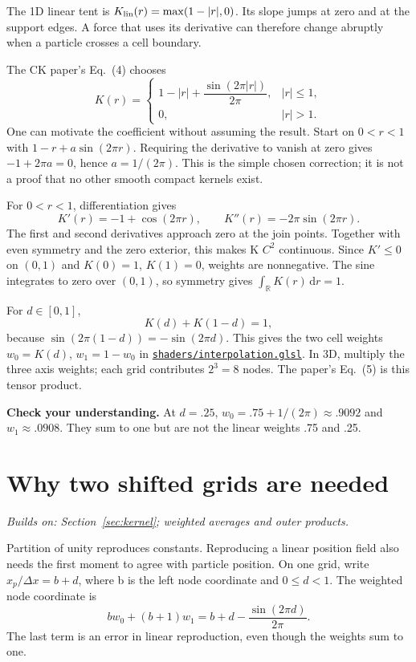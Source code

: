 \documentclass[11pt,a4paper]{article}
\newcommand{\src}[1]{\href{../../#1}{\nolinkurl{#1}}}
\newcommand{\prereq}[1]{\textit{Builds on: #1}\par}
\newcommand{\checkpoint}[1]{\par\textbf{Check your understanding.} #1\par}
\numberwithin{equation}{section}
\begin{document}
The 1D linear tent is $K_{\rm lin}(r)=\max(1-|r|,0)$. Its slope jumps at zero
and at the support edges. A force that uses its derivative can therefore change
abruptly when a particle crosses a cell boundary.

The CK paper's Eq.~(4) chooses
\begin{equation}\label{eq:ck}
K(r)=\begin{cases}
1-|r|+\dfrac{\sin(2\pi|r|)}{2\pi},& |r|\le1,\\
0,&|r|>1.
\end{cases}
\end{equation}
One can motivate the coefficient without assuming the result. Start on
$0<r<1$ with $1-r+a\sin(2\pi r)$. Requiring the derivative to vanish at zero
gives $-1+2\pi a=0$, hence $a=1/(2\pi)$. This is the simple chosen correction;
it is not a proof that no other smooth compact kernels exist.

For $0<r<1$, differentiation gives
\[
K'(r)=-1+\cos(2\pi r),\qquad K''(r)=-2\pi\sin(2\pi r).
\]
The first and second derivatives approach zero at the join points. Together
with even symmetry and the zero exterior, this makes K $C^2$ continuous.
Since $K'\le0$ on $(0,1)$ and $K(0)=1$, $K(1)=0$, weights are nonnegative.
The sine integrates to zero over $(0,1)$, so symmetry gives
$\int_{\mathbb R}K(r)\,\mathrm dr=1$.

For $d\in[0,1]$,
\begin{equation}\label{eq:unity}
K(d)+K(1-d)=1,
\end{equation}
because $\sin(2\pi(1-d))=-\sin(2\pi d)$.
This gives the two cell weights $w_0=K(d)$, $w_1=1-w_0$ in
\src{shaders/interpolation.glsl}. In 3D, multiply the three axis weights;
each grid contributes $2^3=8$ nodes. The paper's Eq.~(5) is this tensor product.

\checkpoint{At $d=.25$, $w_0=.75+1/(2\pi)\approx.9092$ and $w_1\approx.0908$.
They sum to one but are not the linear weights .75 and .25.}

\section{Why two shifted grids are needed}\label{sec:dual}
\prereq{Section~\ref{sec:kernel}; weighted averages and outer products.}
Partition of unity reproduces constants. Reproducing a linear position field
also needs the first moment to agree with particle position.
On one grid, write $x_p/\Delta x=b+d$, where b is the left node coordinate and
$0\le d<1$. The weighted node coordinate is
\[
bw_0+(b+1)w_1=b+d-\frac{\sin(2\pi d)}{2\pi}.
\]
The last term is an error in linear reproduction, even though the weights sum
to one.
\end{document}
